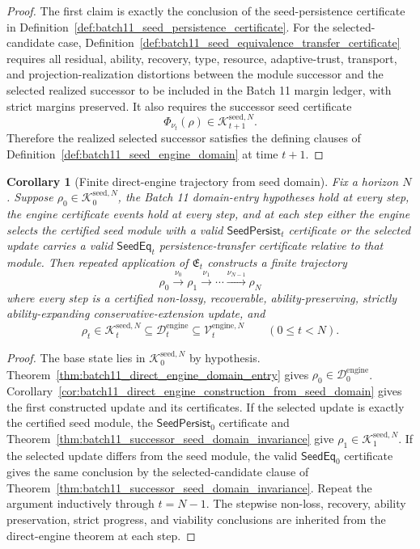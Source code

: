 \documentclass[11pt]{article}
\newtheorem{corollary}[theorem]{Corollary}
\newcommand{\1}{\mathbf{1}}
\providecommand{\Dcal}{\mathcal{D}}
\providecommand{\Kcal}{\mathcal{K}}
\providecommand{\Vcal}{\mathcal{V}}
\begin{document}
\begin{proof}
The first claim is exactly the conclusion of the seed-persistence certificate in Definition~\ref{def:batch11_seed_persistence_certificate}.  For the selected-candidate case, Definition~\ref{def:batch11_seed_equivalence_transfer_certificate} requires all residual, ability, recovery, type, resource, adaptive-trust, transport, and projection-realization distortions between the module successor and the selected realized successor to be included in the Batch 11 margin ledger, with strict margins preserved.  It also requires the successor seed certificate
\[
\Phi_{\nu_t}(\rho)\in\Kcal_{t+1}^{\mathrm{seed},N}.
\]
Therefore the realized selected successor satisfies the defining clauses of Definition~\ref{def:batch11_seed_engine_domain} at time \(t+1\).
\end{proof}

\begin{corollary}[Finite direct-engine trajectory from seed domain]
\label{cor:batch11_finite_direct_engine_trajectory_from_seed}
Fix a horizon \(N\).  Suppose \(\rho_0\in\Kcal_0^{\mathrm{seed},N}\), the Batch 11 domain-entry hypotheses hold at every step, the engine certificate events hold at every step, and at each step either the engine selects the certified seed module with a valid \(\mathsf{SeedPersist}_t\) certificate or the selected update carries a valid \(\mathsf{SeedEq}_t\) persistence-transfer certificate relative to that module.  Then repeated application of \(\mathfrak E_t\) constructs a finite trajectory
\[
\rho_0\xrightarrow{\nu_0}\rho_1\xrightarrow{\nu_1}\cdots\xrightarrow{\nu_{N-1}}\rho_N
\]
where every step is a certified non-lossy, recoverable, ability-preserving, strictly ability-expanding conservative-extension update, and
\[
\rho_t\in\Kcal_t^{\mathrm{seed},N}
\subseteq
\Dcal_t^{\mathrm{engine}}
\subseteq
\Vcal_t^{\mathrm{engine},N}
\qquad(0\le t<N).
\]
\end{corollary}

\begin{proof}
The base state lies in \(\Kcal_0^{\mathrm{seed},N}\) by hypothesis.  Theorem~\ref{thm:batch11_direct_engine_domain_entry} gives \(\rho_0\in\Dcal_0^{\mathrm{engine}}\).  Corollary~\ref{cor:batch11_direct_engine_construction_from_seed_domain} gives the first constructed update and its certificates.  If the selected update is exactly the certified seed module, the \(\mathsf{SeedPersist}_0\) certificate and Theorem~\ref{thm:batch11_successor_seed_domain_invariance} give \(\rho_1\in\Kcal_1^{\mathrm{seed},N}\).  If the selected update differs from the seed module, the valid \(\mathsf{SeedEq}_0\) certificate gives the same conclusion by the selected-candidate clause of Theorem~\ref{thm:batch11_successor_seed_domain_invariance}.  Repeat the argument inductively through \(t=N-1\).  The stepwise non-loss, recovery, ability preservation, strict progress, and viability conclusions are inherited from the direct-engine theorem at each step.
\end{proof}
\end{document}
